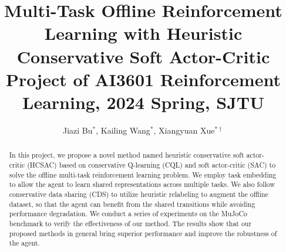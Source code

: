 \documentclass{article}
\title{Multi-Task Offline Reinforcement Learning with Heuristic Conservative Soft Actor-Critic\\
\vspace{0.5em} \normalsize Project of AI3601 Reinforcement Learning, 2024 Spring, SJTU}
\author{Jiazi Bu$^{\ast}$, Kailing Wang$^{\ast}$, Xiangyuan Xue$^{\ast\dagger}$}
\affil[]{School of Electronic Information and Electrical Engineering\\
\footnotesize $^\ast$Equal Contribution \quad $^\dagger$Project Leader}
\begin{document}
\maketitle

\begin{abstract}
In this project, we propose a novel method named heuristic conservative soft actor-critic (HCSAC) based on conservative Q-learning (CQL) and soft actor-critic (SAC) to solve the offline multi-task reinforcement learning problem. We employ task embedding to allow the agent to learn shared representations across multiple tasks. We also follow conservative data sharing (CDS) to utilize heuristic relabeling to augment the offline dataset, so that the agent can benefit from the shared transitions while avoiding performance degradation. We conduct a series of experiments on the MuJoCo benchmark to verify the effectiveness of our method. The results show that our proposed methods in general bring superior performance and improve the robustness of the agent.
\end{abstract}










\end{document}
